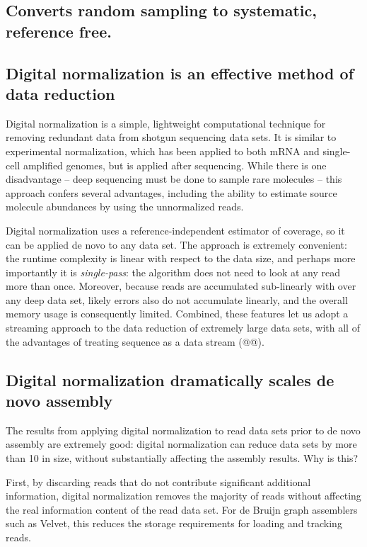 \documentclass[10pt,draft]{article}
\begin{document}
\subsection*{Converts random sampling to systematic, reference free.}

\subsection*{Digital normalization is an effective method of data reduction}

Digital normalization is a simple, lightweight computational technique
for removing redundant data from shotgun sequencing data sets.  It is
similar to experimental normalization, which has been applied to both
mRNA and single-cell amplified genomes, but is applied after
sequencing.  While there is one disadvantage -- deep sequencing must
be done to sample rare molecules -- this approach confers several
advantages, including the ability to estimate source molecule abundances by
using the unnormalized reads.

Digital normalization uses a reference-independent estimator of
coverage, so it can be applied de novo to any data set.  The approach
is extremely convenient: the runtime complexity is linear with respect
to the data size, and perhaps more importantly it is {\em
single-pass}: the algorithm does not need to look at any read more
than once.  Moreover, because reads are accumulated sub-linearly with
over any deep data set, likely errors also do not accumulate linearly,
and the overall memory usage is consequently limited.  Combined, these
features let us adopt a streaming approach to the data reduction of
extremely large data sets, with all of the advantages of treating
sequence as a data stream (@@).

\subsection*{Digital normalization dramatically scales de novo assembly}

The results from applying digital normalization to read data sets
prior to de novo assembly are extremely good: digital normalization
can reduce data sets by more than 10 in size, without substantially
affecting the assembly results.  Why is this?

First, by discarding reads that do not contribute significant
additional information, digital normalization removes the majority of
reads without affecting the real information content of the read data
set.  For de Bruijn graph assemblers such as Velvet, this reduces the
storage requirements for loading and tracking reads.
\end{document}
